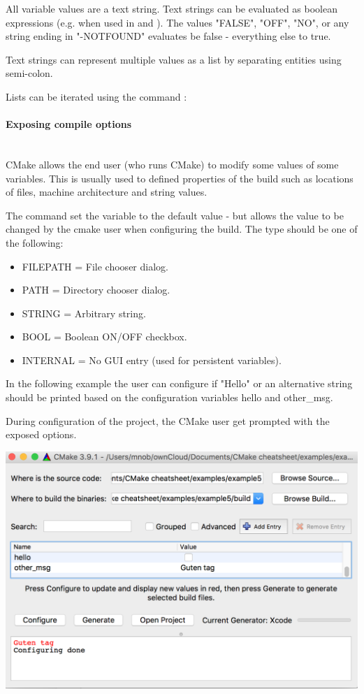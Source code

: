 \documentclass[11pt,a4paper,landscape]{scrartcl} %
\newcommand{\sectiontitle}[1]{\paragraph{#1} \ \\} %
\begin{document}
\begin{multicols}{2}
All variable values are a text string. Text strings can be evaluated as boolean expressions (e.g. when used in  and ). The values "FALSE", "OFF", "NO", or any string ending in "-NOTFOUND" evaluates be false - everything else to true.

Text strings can represent multiple values as a list by separating entities using semi-colon.



Lists can be iterated using the command :


			
\sectiontitle{Exposing compile options}
			
CMake allows the end user (who runs CMake) to modify some values of some variables.  This is usually used to defined properties of the build such as locations of files, machine architecture and string values.

The command  set the variable to the default value - but allows the value to be changed by the cmake user when configuring the build. The type should be one of the following:

\begin{itemize}  
\item FILEPATH = File chooser dialog.
\item PATH     = Directory chooser dialog.
\item STRING   = Arbitrary string.
\item BOOL     = Boolean ON/OFF checkbox.
\item INTERNAL = No GUI entry (used for persistent variables).
\end{itemize}

In the following example the user can configure if "Hello" or an alternative string should be printed based on the configuration variables hello and other\_msg.
 


During configuration of the project, the CMake user get prompted with the exposed options.

\includegraphics[width=\columnwidth]{variable-options}


\end{multicols}
\end{document}
